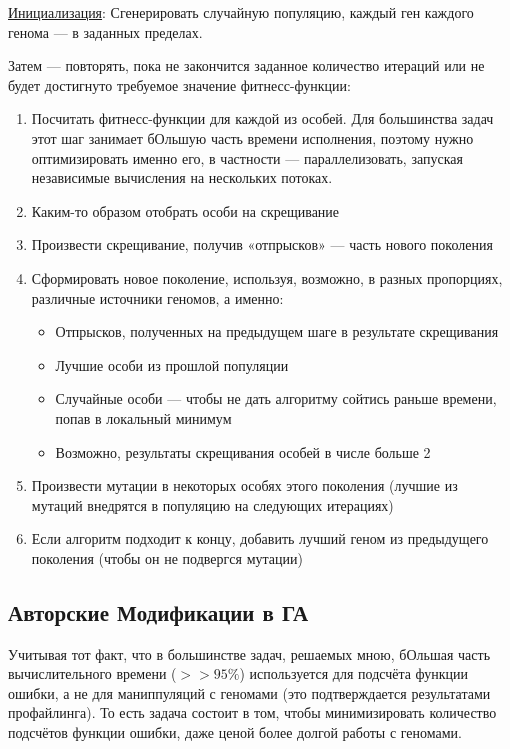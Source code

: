 \underline{Инициализация}: Сгенерировать случайную популяцию, каждый ген каждого генома — в заданных пределах.

Затем — повторять, пока не закончится заданное количество итераций или не будет достигнуто требуемое значение фитнесс-функции:
\begin{enumerate}
    \item Посчитать фитнесс-функции для каждой из особей.
    Для большинства задач этот шаг занимает бОльшую часть времени исполнения, поэтому нужно оптимизировать именно его, в частности — параллелизовать, запуская независимые вычисления на нескольких потоках.
    \item Каким-то образом отобрать особи на скрещивание
    \item Произвести скрещивание, получив «отпрысков» — часть нового поколения
    \item Сформировать новое поколение, используя, возможно, в разных пропорциях, различные источники геномов, а именно:
            \begin{itemize}
                \item Отпрысков, полученных на предыдущем шаге в результате скрещивания
                \item Лучшие особи из прошлой популяции
                \item Случайные особи —  чтобы не дать алгоритму сойтись раньше времени, попав в локальный минимум
                \item Возможно, результаты скрещивания особей в числе больше 2
            \end{itemize}
    \item Произвести мутации в некоторых особях этого поколения (лучшие из мутаций внедрятся в популяцию на следующих итерациях)
    \item Если алгоритм подходит к концу, добавить лучший геном из предыдущего поколения (чтобы он не подвергся мутации)
\end{enumerate}

\subsection{Авторские Модификации  в ГА}\label{sec:my_modifications}

Учитывая тот факт, что в большинстве задач, решаемых мною, бОльшая часть вычислительного времени ($>> 95\%$) используется для подсчёта функции ошибки, а не для маниппуляций с геномами
(это подтверждается результатами профайлинга).
То есть задача состоит в том, чтобы минимизировать количество подсчётов функции ошибки, даже ценой более долгой работы с геномами.

